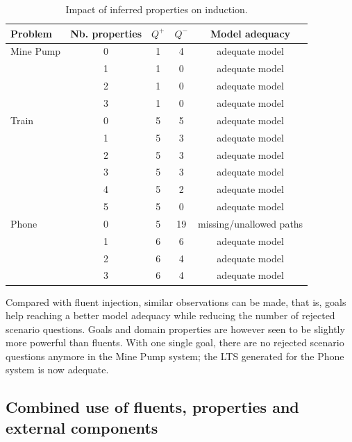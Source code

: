 \begin{table}
\centering
\begin{tabular}{|l||c||c|c|c|}\hline
Problem   & Nb. properties &$Q^+$&$Q^-$& Model adequacy\\\hline\hline
Mine Pump & 0              & 1   & 4   & adequate model\\\cline{2-5}
          & 1              & 1   & 0   & adequate model\\\cline{2-5}
          & 2              & 1   & 0   & adequate model\\\cline{2-5}
          & 3              & 1   & 0   & adequate model\\\hline\hline
Train     & 0              & 5   & 5   & adequate model\\\cline{2-5}
          & 1              & 5   & 3   & adequate model\\\cline{2-5}
          & 2              & 5   & 3   & adequate model\\\cline{2-5}
          & 3              & 5   & 3   & adequate model\\\cline{2-5}
          & 4              & 5   & 2   & adequate model\\\cline{2-5}
          & 5              & 5   & 0   & adequate model\\\hline\hline
Phone     & 0              & 5   & 19  & missing/unallowed paths\\\cline{2-5}
          & 1              & 6   & 6   & adequate model\\\cline{2-5}
          & 2              & 6   & 4   & adequate model\\\cline{2-5}
          & 3              & 6   & 4   & adequate model\\\hline
\end{tabular}
\caption{Impact of inferred properties on induction.\label{Properties:res}}
\end{table}

Compared with fluent injection, similar observations can be made, that is, goals help reaching a better model adequacy while reducing the number of rejected scenario questions. Goals and domain properties are however seen to be slightly more powerful than fluents. With one single goal, there are no rejected scenario questions anymore in the Mine Pump system; the LTS generated for the Phone system is now adequate.


\subsection{Combined use of fluents, properties and external components}

